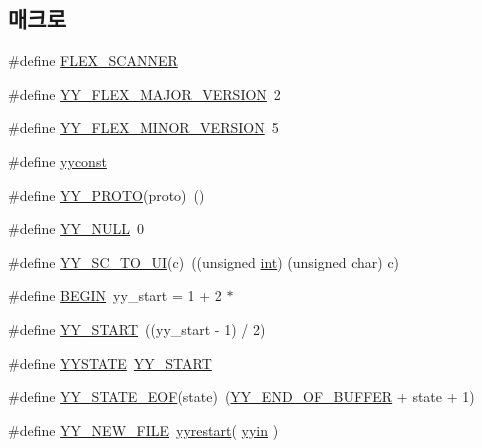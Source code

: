 \subsection*{매크로}
\begin{DoxyCompactItemize}
\item 
\#define \mbox{\hyperlink{expr-lex_8cpp_a3c3d1ef92e93b0bc81d7760a73d5c3b6}{F\+L\+E\+X\+\_\+\+S\+C\+A\+N\+N\+ER}}
\item 
\#define \mbox{\hyperlink{expr-lex_8cpp_a243ca1d30872935faf05ea5118ed6fdc}{Y\+Y\+\_\+\+F\+L\+E\+X\+\_\+\+M\+A\+J\+O\+R\+\_\+\+V\+E\+R\+S\+I\+ON}}~2
\item 
\#define \mbox{\hyperlink{expr-lex_8cpp_a90f9d458829400869e47efb68a865677}{Y\+Y\+\_\+\+F\+L\+E\+X\+\_\+\+M\+I\+N\+O\+R\+\_\+\+V\+E\+R\+S\+I\+ON}}~5
\item 
\#define \mbox{\hyperlink{expr-lex_8cpp_aa2f1a918be586b44bf08126bde2d7cc9}{yyconst}}
\item 
\#define \mbox{\hyperlink{expr-lex_8cpp_ad1c3fde80f461fe055f996f4ec6d4830}{Y\+Y\+\_\+\+P\+R\+O\+TO}}(proto)~()
\item 
\#define \mbox{\hyperlink{expr-lex_8cpp_a8e0bcf8f8a5b613ea583347f8bc31cbf}{Y\+Y\+\_\+\+N\+U\+LL}}~0
\item 
\#define \mbox{\hyperlink{expr-lex_8cpp_af1185350b7a92cf8aa5324c68850c8a6}{Y\+Y\+\_\+\+S\+C\+\_\+\+T\+O\+\_\+\+UI}}(c)~((unsigned \mbox{\hyperlink{_util_8cpp_a0ef32aa8672df19503a49fab2d0c8071}{int}}) (unsigned char) c)
\item 
\#define \mbox{\hyperlink{expr-lex_8cpp_ab766bbbee08d04b67e3fe599d6900873}{B\+E\+G\+IN}}~yy\+\_\+start = 1 + 2 $\ast$
\item 
\#define \mbox{\hyperlink{expr-lex_8cpp_a8e14785f9eab7a997d659b25af9584c5}{Y\+Y\+\_\+\+S\+T\+A\+RT}}~((yy\+\_\+start -\/ 1) / 2)
\item 
\#define \mbox{\hyperlink{expr-lex_8cpp_a32b5b960944f946b192d54f672569cd9}{Y\+Y\+S\+T\+A\+TE}}~\mbox{\hyperlink{expr-lex_8cpp_a8e14785f9eab7a997d659b25af9584c5}{Y\+Y\+\_\+\+S\+T\+A\+RT}}
\item 
\#define \mbox{\hyperlink{expr-lex_8cpp_ab3077e60914fc54dcc55ecae1ce9700b}{Y\+Y\+\_\+\+S\+T\+A\+T\+E\+\_\+\+E\+OF}}(state)~(\mbox{\hyperlink{expr-lex_8cpp_ab2708fd42cff29ce6a0a52b91bea40d1}{Y\+Y\+\_\+\+E\+N\+D\+\_\+\+O\+F\+\_\+\+B\+U\+F\+F\+ER}} + state + 1)
\item 
\#define \mbox{\hyperlink{expr-lex_8cpp_a0406739e64fb5750cf995d2ae68ce69d}{Y\+Y\+\_\+\+N\+E\+W\+\_\+\+F\+I\+LE}}~\mbox{\hyperlink{expr-lex_8cpp_a3528c58cdd338886f23357f42e2061b8}{yyrestart}}( \mbox{\hyperlink{expr_8cpp_a46af646807e0797e72b6e8945e7ea88b}{yyin}} )

\end{DoxyCompactItemize}
